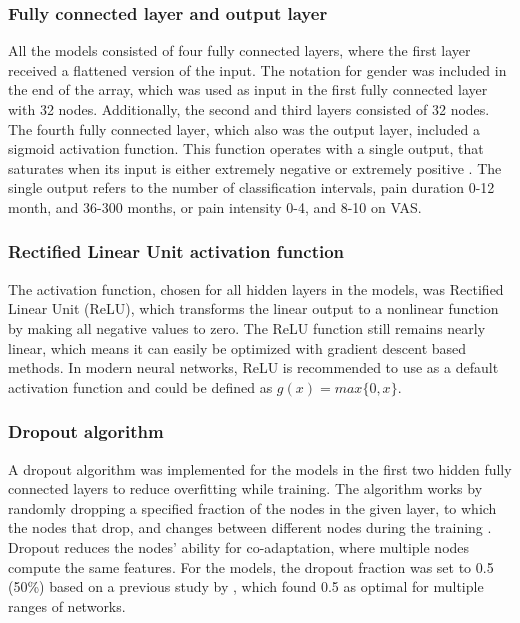 \subsubsection{Fully connected layer and output layer}
All the models consisted of four fully connected layers, where the first layer received a flattened version of the input. The notation for gender was included in the end of the array, which was used as input in the first fully connected layer with 32 nodes. Additionally, the second and third layers consisted of 32 nodes. The fourth fully connected layer, which also was the output layer, included a sigmoid activation function. 
This function operates with a single output, that saturates when its input is either extremely negative or extremely positive \citep{Goodfellow2016}. The single output refers to the number of classification intervals, pain duration 0-12 month, and 36-300 months, or pain intensity 0-4, and 8-10 on VAS. 

\subsubsection{Rectified Linear Unit activation function}
The activation function, chosen for all hidden layers in the models, was Rectified Linear Unit (ReLU), which transforms the linear output to a nonlinear function by making all negative values to zero. The ReLU function still remains nearly linear, which means it can easily be optimized with gradient descent based methods. In modern neural networks, ReLU is recommended to use as a default activation function and could be defined as $g(x) = max\{0, x\}$.\citep{Goodfellow2016}

\subsubsection{Dropout algorithm}
A dropout algorithm was implemented for the models in the first two hidden fully connected layers to reduce overfitting while training. The algorithm works by randomly dropping a specified fraction of the nodes in the given layer, to which the nodes that drop, and changes between different nodes during the training \citep{Srivastava2014}. Dropout reduces the nodes’ ability for co-adaptation, where multiple nodes compute the same features. For the models, the dropout fraction was set to 0.5 (50\%) based on a previous study by \citeauthor{Srivastava2014} \citep{Srivastava2014}, which found 0.5 as optimal for multiple ranges of networks.

